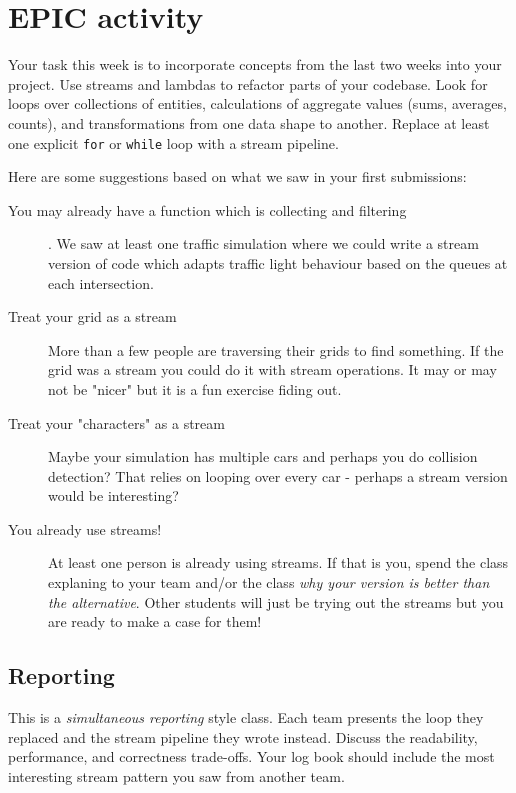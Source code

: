 \documentclass[twoside=false,DIV=14]{scrartcl}
\begin{document}
\section*{EPIC activity}

Your task this week is to incorporate concepts from the last two weeks into your project.  Use streams and lambdas to refactor parts of your codebase.  Look for loops over collections of entities, calculations of aggregate values (sums, averages, counts), and transformations from one data shape to another.  Replace at least one explicit \texttt{for} or \texttt{while} loop with a stream pipeline.

Here are some suggestions based on what we saw in your first submissions:
\begin{description}
\item[You may already have a function which is collecting and filtering].  We saw at least one traffic simulation where we could write a stream version of code which adapts traffic light behaviour based on the queues at each intersection.
\item[Treat your grid as a stream]  More than a few people are traversing their grids to find something.  If the grid was a stream you could do it with stream operations.  It may or may not be "nicer" but it is a fun exercise fiding out.
\item[Treat your "characters" as a stream]  Maybe your simulation has multiple cars and perhaps you do collision detection?  That relies on looping over every car - perhaps a stream version would be interesting?
\item[You already use streams!] At least one person is already using streams.  If that is you, spend the class explaning to your team and/or the class \emph{why your version is better than the alternative}.  Other students will just be trying out the streams but you are ready to make a case for them!
\end{description}

\subsection*{Reporting}

This is a \emph{simultaneous reporting} style class.  Each team presents the loop they replaced and the stream pipeline they wrote instead.  Discuss the readability, performance, and correctness trade-offs.  Your log book should include the most interesting stream pattern you saw from another team.
\end{document}
